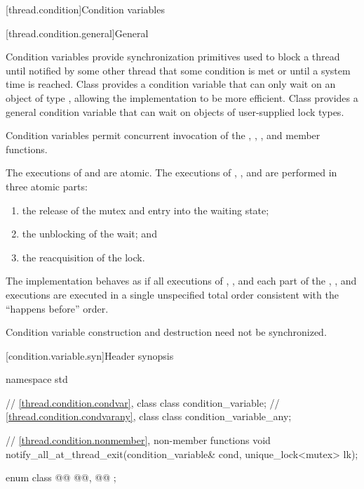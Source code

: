 [thread.condition]{Condition variables}

[thread.condition.general]{General}

\pnum
Condition variables provide synchronization primitives used to block a thread until
notified by some other thread that some condition is met or until a system time is
reached. Class  provides a condition variable that can only
wait on an object of type , allowing the implementation
to be more efficient. Class  provides a general
condition variable that can wait on objects of user-supplied lock types.

\pnum
Condition variables permit concurrent invocation of the , ,
,  and  member functions.

\pnum
The executions of  and 
are atomic.
The executions of , , and  are performed
in three atomic parts:
\begin{enumerate}
\item the release of the mutex and entry into the waiting state;
\item the unblocking of the wait; and
\item the reacquisition of the lock.
\end{enumerate}

\pnum
The implementation behaves as if all executions of , , and each
part of the , , and  executions are
executed in a single unspecified total order consistent with the ``happens before'' order.

\pnum
Condition variable construction and destruction need not be synchronized.

[condition.variable.syn]{Header  synopsis}

%
\begin{codeblock}
namespace std {
  // \ref{thread.condition.condvar}, class 
  class condition_variable;
  // \ref{thread.condition.condvarany}, class 
  class condition_variable_any;

  // \ref{thread.condition.nonmember}, non-member functions
  void notify_all_at_thread_exit(condition_variable& cond, unique_lock<mutex> lk);

  enum class @@ { @@, @@ };
}
\end{codeblock}

